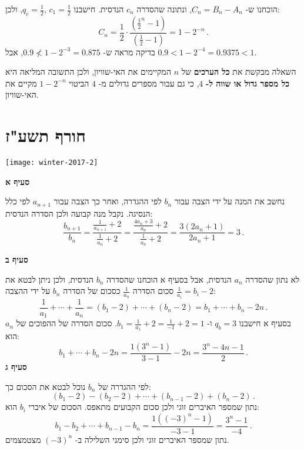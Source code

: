 הוכחנו ש-%
$C_n=B_n-A_n$,
ונתונה שהסדרה 
$c_n$
הנדסית. חישבנו 
$q_c=\frac{1}{2},\,c_1=\frac{1}{2}$,
ולכן:
\[
C_n = \frac{1}{2}\cdot\frac{\displaystyle\left(\frac{1}{2}^n-1\right)}{\displaystyle\left(\frac{1}{2}-1\right)}=1-2^{-n}\,.
\]
בדיקה מראה ש-%
$0.9 \not< 1-2^{-3}=0.875$,
אבל
$0.9 < 1-2^{-4}=0.9375 < 1$.

השאלה מבקשת את
\textbf{כל הערכים}
של
$n$
המקיימים את האי-שוויון, ולכן התשובה המליאה היא 
\textbf{כל מספר גדול או שווה ל-}%
$4$,
כי גם עבור מספרים גדולים מ-%
$4$
הביטוי
$1-2^{-n}$
מקיים את האי-שוויון.

\np
\section{חורף תשע"ז}

\begin{center}
\texttt{[image: winter-2017-2]}
\end{center}

\vspace{-2ex}

\textbf{סעיף א}

נחשב את המנה על ידי הצבה עבור 
$b_n$
לפי ההגדרה, ואחר כך הצבה עבור 
$a_{n+1}$
לפי כלל הנסיגה. נקבל מנה קבועה ולכן הסדרה הנדסית:
\[
\frac{b_{n+1}}{b_n} = \frac{\displaystyle\frac{1}{a_{n+1}}+2}{\displaystyle\frac{1}{a_{n}}+2}= \frac{\displaystyle\frac{4a_n+3}{a_n}+2}{\displaystyle\frac{1}{a_{n}}+2}=\frac{3(2a_n+1)}{2a_n+1}=3\,.
\]
\vspace{-3ex}

\textbf{סעיף ב}

לא נתון שהסדרה $a_n$ הנדסית, אבל בסעיף א הוכחנו שהסדרה  
$b_n$
הנדסית, ולכן ניתן לבטא את סכום הסדרה
$\displaystyle\frac{1}{a_n}$
כסכום של הסדרה
$b_n$
על ידי ההצבה 
$\displaystyle\frac{1}{a_i} = b_i - 2$:
\[
\frac{1}{a_1} + \cdots + \frac{1}{a_n}=(b_1-2) + \cdots + (b_n-2)=b_1+\cdots+b_n- 2n\,.
\]
בסעיף א חישבנו 
$q_b=3$
ו-%
$b_1=\displaystyle\frac{1}{a_1}+2=\displaystyle\frac{1}{-1}+2=1$.
סכום הסדרה של ההפוכים של 
$a_n$
הוא:
\[
b_1+\cdots+b_n- 2n=\frac{1(3^n-1)}{3-1} - 2n = \frac{3^n - 4n -1}{2}\,.
\]
\textbf{סעיף ג}

לפי ההגדרה של 
$b_n$
נוכל לבטא את הסכום כך:
\[
(b_1 - 2) - (b_2 - 2) + \cdots + (b_{n-1} - 2) + (b_n - 2)\,.
\]
נתון שמספר האיברים זוגי ולכן סכום הקבועים מתאפס. הסכום של איברי
$b_i$
הוא:
\[
b_1-b_2+\cdots+b_{n-1}-b_n=\frac{1((-3)^n-1)}{-3-1}=\frac{3^n-1}{-4}\,.
\]
נתון שמספר האיברים זוגי ולכן סימני השלילה ב-%
$(-3)^n$
מצטמצמים.


